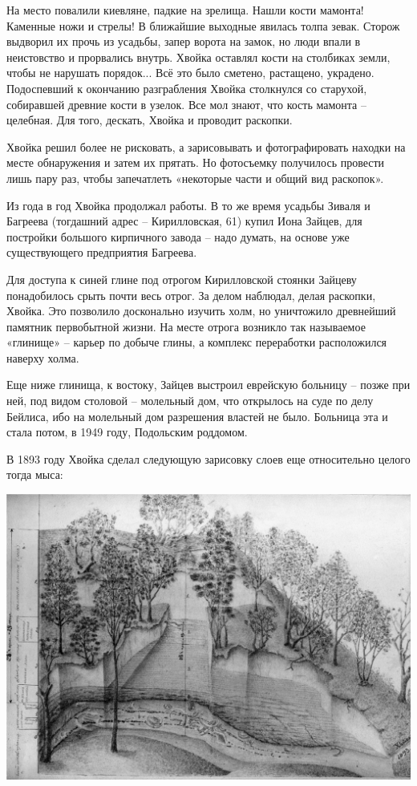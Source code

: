 На место повалили киевляне, падкие на зрелища. Нашли кости мамонта! Каменные ножи и стрелы! В ближайшие выходные явилась толпа зевак. Сторож выдворил их прочь из усадьбы, запер ворота на замок, но люди впали в неистовство и прорвались внутрь. Хвойка оставлял кости на столбиках земли, чтобы не нарушать порядок... Всё это было сметено, растащено, украдено. Подоспевший к окончанию разграбления Хвойка столкнулся со старухой, собиравшей древние кости в узелок. Все мол знают, что кость мамонта – целебная. Для того, дескать, Хвойка и проводит раскопки.

Хвойка решил более не рисковать, а зарисовывать и фотографировать находки на месте обнаружения и затем их прятать. Но фотосъемку получилось провести лишь пару раз, чтобы запечатлеть «некоторые части и общий вид раскопок».

Из года в год Хвойка продолжал работы. В то же время усадьбы Зиваля и Багреева (тогдашний адрес – Кирилловская, 61) купил Иона Зайцев, для постройки большого кирпичного завода – надо думать, на основе уже существующего предприятия Багреева. 

Для доступа к синей глине под отрогом Кирилловской стоянки Зайцеву понадобилось срыть почти весь отрог. За делом наблюдал, делая раскопки, Хвойка. Это позволило досконально изучить холм, но уничтожило древнейший памятник первобытной жизни. На месте отрога возникло так называемое «глинище» – карьер по добыче глины, а комплекс переработки расположился наверху холма.

Еще ниже глинища, к востоку, Зайцев выстроил еврейскую больницу – позже при ней, под видом столовой – молельный дом, что открылось на суде по делу Бейлиса, ибо на молельный дом разрешения властей не было. Больница эта и стала потом, в 1949 году, Подольским роддомом.

В 1893 году Хвойка сделал следующую зарисовку слоев еще относительно целого тогда мыса:

\begin{center}
\includegraphics[width=\linewidth]{chast-kirvys/kirstoy/1893-hvoyka-03-2.jpg}
\end{center}

